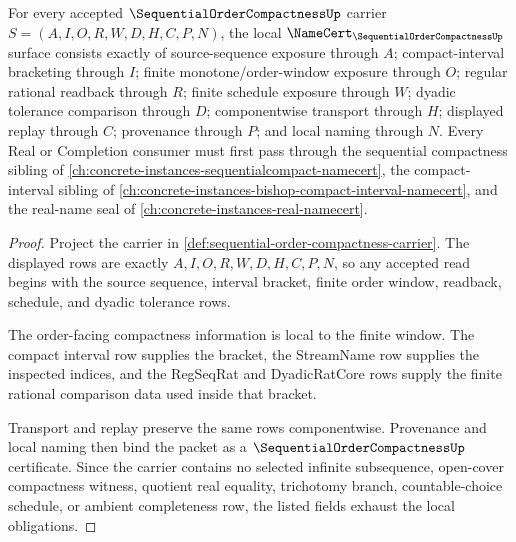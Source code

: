 \begin{theorem}
\label{thm:sequential-order-compactness-namecert-obligations}
For every accepted $\SequentialOrderCompactnessUp$ carrier $S=(A,I,O,R,W,D,H,C,P,N)$, the local $\NameCert_{\SequentialOrderCompactnessUp}$ surface consists exactly of source-sequence exposure through $A$; compact-interval bracketing through $I$; finite monotone/order-window exposure through $O$; regular rational readback through $R$; finite schedule exposure through $W$; dyadic tolerance comparison through $D$; componentwise transport through $H$; displayed replay through $C$; provenance through $P$; and local naming through $N$. Every Real or Completion consumer must first pass through the sequential compactness sibling of \autoref{ch:concrete-instances-sequentialcompact-namecert}, the compact-interval sibling of \autoref{ch:concrete-instances-bishop-compact-interval-namecert}, and the real-name seal of \autoref{ch:concrete-instances-real-namecert}.
\end{theorem}
\begin{proof}
Project the carrier in \autoref{def:sequential-order-compactness-carrier}. The displayed rows are exactly $A,I,O,R,W,D,H,C,P,N$, so any accepted read begins with the source sequence, interval bracket, finite order window, readback, schedule, and dyadic tolerance rows.

The order-facing compactness information is local to the finite window. The compact interval row supplies the bracket, the StreamName row supplies the inspected indices, and the RegSeqRat and DyadicRatCore rows supply the finite rational comparison data used inside that bracket.

Transport and replay preserve the same rows componentwise. Provenance and local naming then bind the packet as a $\SequentialOrderCompactnessUp$ certificate. Since the carrier contains no selected infinite subsequence, open-cover compactness witness, quotient real equality, trichotomy branch, countable-choice schedule, or ambient completeness row, the listed fields exhaust the local obligations.
\end{proof}

